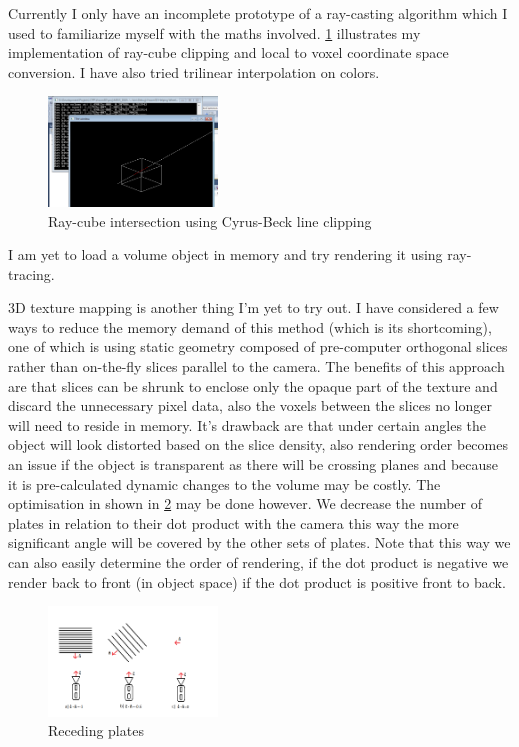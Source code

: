 \documentclass[11pt,fleqn,twoside]{article}
\begin{document}
Currently I only have an incomplete prototype of a ray-casting algorithm which I used to familiarize myself with the maths involved. \ref{fig:rayCube} illustrates my implementation of ray-cube clipping and local to voxel coordinate space conversion. I have also tried trilinear interpolation on colors.
\begin{figure}[htb]
\centering
\includegraphics[width=0.4\textwidth]{ray-cube-intersection}
\caption{Ray-cube intersection using Cyrus-Beck line clipping}
\label{fig:rayCube}
\end{figure}
I am yet to load a volume object in memory and try rendering it using ray-tracing.

3D texture mapping is another thing I'm yet to try out. I have considered a few ways to reduce the memory demand of this method (which is its shortcoming), one of which is using static geometry composed of pre-computer orthogonal slices\cite{TextureMappingTut} rather than on-the-fly slices parallel to the camera. The benefits of this approach are that slices can be shrunk to enclose only the opaque part of the texture and discard the unnecessary pixel data, also the voxels between the slices no longer will need to reside in memory. It's drawback are that under certain angles the object will look distorted based on the slice density, also rendering order becomes an issue if the object is transparent as there will be crossing planes and because it is pre-calculated dynamic changes to the volume may be costly.
The optimisation in shown in \ref{fig:receedingPlates}  may be done however. We decrease the number of plates in relation to their dot product with the camera this way the more significant angle will be covered by the other sets of plates. Note that this way we can also easily determine the order of rendering, if the dot product is negative we render back to front (in object space) if the dot product is positive front to back.
\begin{figure}[htb]
\centering
\includegraphics[width=0.4\textwidth]{receding-plates}
\caption{Receding plates}
\label{fig:receedingPlates}
\end{figure}
\end{document}

